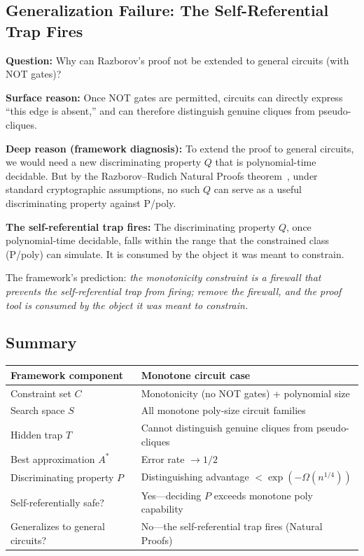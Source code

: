 \documentclass[11pt,a4paper]{article}
\theoremstyle{plain}
\theoremstyle{definition}
\theoremstyle{remark}
\begin{document}
\subsection{Generalization Failure: The Self-Referential Trap Fires}

\textbf{Question:} Why can Razborov's proof not be extended to general circuits (with NOT gates)?

\textbf{Surface reason:} Once NOT gates are permitted, circuits can directly express ``this edge is absent,'' and can therefore distinguish genuine cliques from pseudo-cliques.

\textbf{Deep reason (framework diagnosis):} To extend the proof to general circuits, we would need a new discriminating property $Q$ that is polynomial-time decidable. But by the Razborov--Rudich Natural Proofs theorem~\cite{RazborovRudich1994}, under standard cryptographic assumptions, no such $Q$ can serve as a useful discriminating property against P/poly.

\textbf{The self-referential trap fires:} The discriminating property $Q$, once polynomial-time decidable, falls within the range that the constrained class (P/poly) can simulate. It is consumed by the object it was meant to constrain.

The framework's prediction: \emph{the monotonicity constraint is a firewall that prevents the self-referential trap from firing; remove the firewall, and the proof tool is consumed by the object it was meant to constrain.}

\subsection{Summary}

\begin{table}[h]
\centering
\begin{tabular}{@{}ll@{}}
\toprule
Framework component & Monotone circuit case \\
\midrule
Constraint set $C$ & Monotonicity (no NOT gates) + polynomial size \\
Search space $S$ & All monotone poly-size circuit families \\
Hidden trap $T$ & Cannot distinguish genuine cliques from pseudo-cliques \\
Best approximation $A^*$ & Error rate $\to 1/2$ \\
Discriminating property $P$ & Distinguishing advantage $< \exp(-\Omega(n^{1/4}))$ \\
Self-referentially safe? & Yes---deciding $P$ exceeds monotone poly capability \\
Generalizes to general circuits? & No---the self-referential trap fires (Natural Proofs) \\
\bottomrule
\end{tabular}
\end{table}
\end{document}
